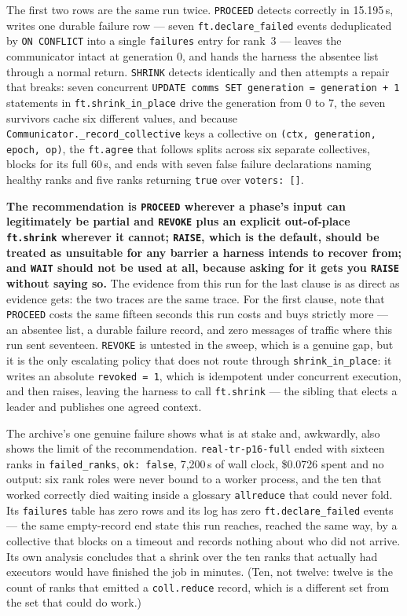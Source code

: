 \documentclass[11pt]{article}
\begin{document}
The first two rows are the same run twice. \texttt{PROCEED} detects correctly in
15.195\,s, writes one durable failure row --- seven \texttt{ft.declare\_failed} events
deduplicated by \texttt{ON CONFLICT} into a single \texttt{failures} entry for rank~3 ---
leaves the communicator intact at generation 0, and hands the harness the absentee list
through a normal return. \texttt{SHRINK} detects identically and then attempts a repair
that breaks: seven concurrent \texttt{UPDATE comms SET generation = generation + 1}
statements in \texttt{ft.shrink\_in\_place} drive the generation from 0 to 7, the seven
survivors cache six different values, and because
\texttt{Communicator.\_record\_collective} keys a collective on
\texttt{(ctx, generation, epoch, op)}, the \texttt{ft.agree} that follows splits across
six separate collectives, blocks for its full 60\,s, and ends with seven false failure
declarations naming healthy ranks and five ranks returning \texttt{true} over
\texttt{voters: []}.

\textbf{The recommendation is \texttt{PROCEED} wherever a phase's input can legitimately
be partial and \texttt{REVOKE} plus an explicit out-of-place \texttt{ft.shrink} wherever
it cannot; \texttt{RAISE}, which is the default, should be treated as unsuitable for any
barrier a harness intends to recover from; and \texttt{WAIT} should not be used at all,
because asking for it gets you \texttt{RAISE} without saying so.} The evidence from this
run for the last clause is as direct as evidence gets: the two traces are the same trace.
For the first clause, note that \texttt{PROCEED} costs the same fifteen seconds this run
costs and buys strictly more --- an absentee list, a durable failure record, and zero
messages of traffic where this run sent seventeen. \texttt{REVOKE} is untested in the
sweep, which is a genuine gap, but it is the only escalating policy that does not route
through \texttt{shrink\_in\_place}: it writes an absolute \texttt{revoked = 1}, which is
idempotent under concurrent execution, and then raises, leaving the harness to call
\texttt{ft.shrink} --- the sibling that elects a leader and publishes one agreed context.

The archive's one genuine failure shows what is at stake and, awkwardly, also shows the
limit of the recommendation. \texttt{real-tr-p16-full} ended with sixteen ranks in
\texttt{failed\_ranks}, \texttt{ok: false}, 7{,}200\,s of wall clock, \$0.0726 spent and no
output: six rank roles were never bound to a worker process, and the ten that worked
correctly died waiting inside a glossary \texttt{allreduce} that could never fold. Its
\texttt{failures} table has zero rows and its log has zero \texttt{ft.declare\_failed}
events --- the same empty-record end state this run reaches, reached the same way, by a
collective that blocks on a timeout and records nothing about who did not arrive. Its own
analysis concludes that a shrink over the ten ranks that actually had executors would have
finished the job in minutes. (Ten, not twelve: twelve is the count of ranks that emitted a
\texttt{coll.reduce} record, which is a different set from the set that could do work.)
\end{document}
